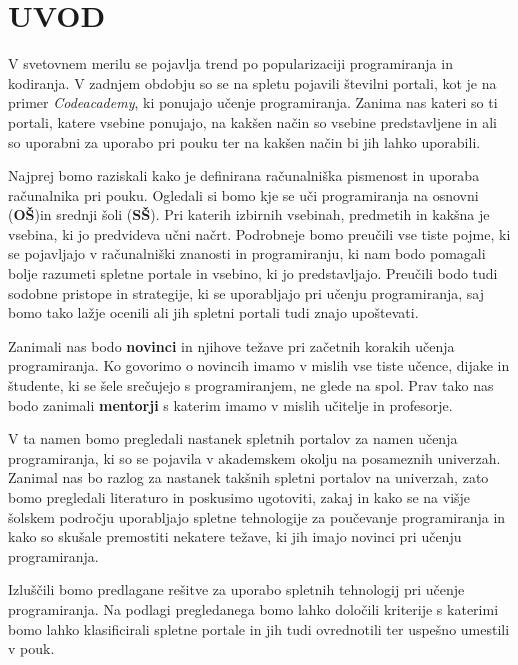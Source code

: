 \section{UVOD}
\label{sec:Uvod}


V svetovnem merilu se pojavlja trend po popularizaciji programiranja
in kodiranja. V zadnjem obdobju so se na spletu pojavili številni
portali, kot je na primer \emph{Codeacademy}, ki ponujajo učenje
programiranja. Zanima nas kateri so ti portali, katere vsebine
ponujajo, na kakšen način so vsebine predstavljene in ali so uporabni
za uporabo pri pouku ter na kakšen način bi jih lahko uporabili.

Najprej bomo raziskali kako je definirana računalniška pismenost in
uporaba računalnika pri pouku. Ogledali si bomo kje se uči
programiranja na osnovni (\textbf{OŠ})in srednji šoli
(\textbf{SŠ}). Pri katerih izbirnih vsebinah, predmetih in kakšna je
vsebina, ki jo predvideva učni načrt. Podrobneje bomo preučili vse
tiste pojme, ki se pojavljajo v računalniški znanosti in
programiranju, ki nam bodo pomagali bolje razumeti spletne portale in
vsebino, ki jo predstavljajo.  Preučili bodo tudi sodobne pristope in
strategije, ki se uporabljajo pri učenju programiranja, saj bomo tako
lažje ocenili ali jih spletni portali tudi znajo upoštevati.

Zanimali nas bodo \textbf{novinci} in njihove težave pri začetnih
korakih učenja programiranja. Ko govorimo o novincih imamo v mislih
vse tiste učence, dijake in študente, ki se šele srečujejo s
programiranjem, ne glede na spol. Prav tako nas bodo zanimali
\textbf{mentorji} s katerim imamo v mislih učitelje in profesorje.

V ta namen bomo pregledali nastanek spletnih portalov za namen učenja
programiranja, ki so se pojavila v akademskem okolju na posameznih
univerzah. Zanimal nas bo razlog za nastanek takšnih spletni portalov
na univerzah, zato bomo pregledali literaturo in poskusimo ugotoviti,
zakaj in kako se na višje šolskem področju uporabljajo spletne
tehnologije za poučevanje programiranja in kako so skušale premostiti
nekatere težave, ki jih imajo novinci pri učenju programiranja.

Izluščili bomo predlagane rešitve za uporabo spletnih tehnologij pri
učenje programiranja. Na podlagi pregledanega bomo lahko določili
kriterije s katerimi bomo lahko klasificirali spletne portale in jih
tudi ovrednotili ter uspešno umestili v pouk.



